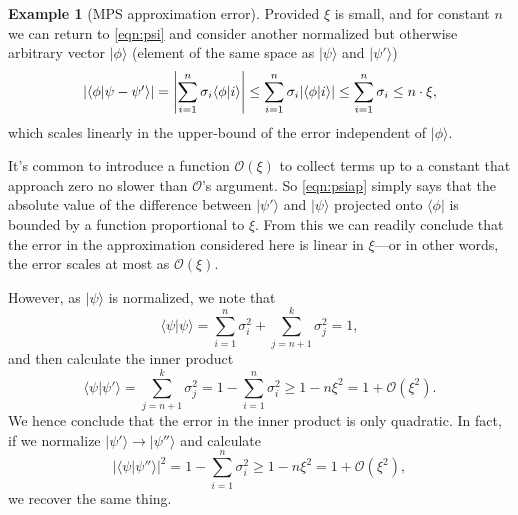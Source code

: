 \documentclass[aps,pra,12pt,nofootinbib,superscriptaddress,longbibliography]{revtex4-1}
\newcommand{\jb}[1]{\todo[inline]{{\textbf{[}JB: #1\textbf{]}}}}
\newcommand{\vb}[1]{}
\theoremstyle{plain}
\theoremstyle{definition}
\newtheorem{example}[theorem]{Example}
\newcommand{\bra}[1]{\mbox{$\langle #1|$}}
\newcommand{\ket}[1]{\mbox{$|#1\rangle$}}
\newcommand{\braket}[2]{\mbox{$\langle #1|#2\rangle$}}
\begin{document}
\begin{example}[MPS approximation error]
Provided $\xi$ is small, and for constant $n$ we can return to \eqref{eqn:psi} and consider another normalized but otherwise arbitrary vector $\ket{\phi}$
(element of the same space as $\ket{\psi}$ and $\ket{\psi'}$)
\begin{equation}\label{eqn:psiap}
|\braket{\phi}{\psi - \psi'}|
= \left| \sum_{i=1}^n \sigma_i \braket{\phi}{i} \right|
\le \sum_{i=1}^n \sigma_i \lvert\braket{\phi}{i}\arrowvert
\leq \sum_{i=1}^n \sigma_i \leq n\cdot \xi,
\end{equation}
which scales linearly in the upper-bound of the error independent of $\ket{\phi}$.  
% 

It's common to introduce a function $\mathcal{O}(\xi)$ to collect terms up to a constant that approach zero no slower than $\mathcal{O}$'s argument.  So \eqref{eqn:psiap} simply says that the absolute value of the difference between $\ket{\psi'}$ and $\ket{\psi}$ projected onto $\bra{\phi}$ is bounded by a function proportional to $\xi$.  From this we can readily conclude that the error in the approximation considered here is linear in $\xi$---or in other words, the error scales at most as $\mathcal{O}(\xi)$. 

However, as $\ket{\psi}$ is normalized, we note that 
\begin{equation}
 \braket{\psi}{\psi} = \sum_{i=1}^n \sigma_i^2 + \sum_{j=n+1}^k \sigma_j^2 = 1,
\end{equation}
and then calculate the inner product  
\begin{equation}
  \braket{\psi}{\psi'} = \sum_{j=n+1}^k \sigma_j^2 = 1 - \sum_{i=1}^n \sigma_i^2 \geq 1 - n \xi^2 = 1+ \mathcal{O}(\xi^2).
\end{equation}
We hence conclude that the error in the inner product is only quadratic.
In fact, if we normalize $\ket{\psi'}\rightarrow\ket{\psi''}$ and calculate 
\begin{equation}
 |\braket{\psi}{\psi''}|^2 = 1 - \sum_{i=1}^n \sigma_i^2 \geq 1 - n \xi^2 = 1+ \mathcal{O}(\xi^2),
\end{equation}
we recover the same thing. 
\end{example}
\end{document}
